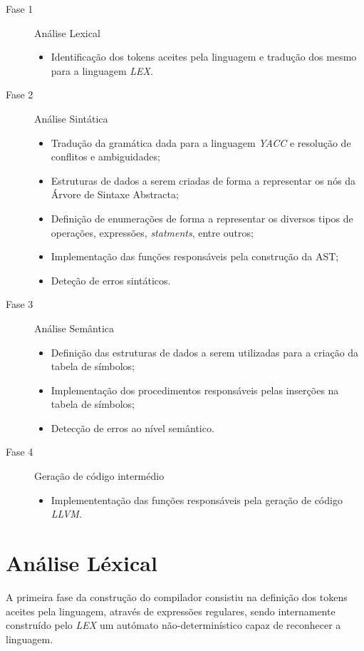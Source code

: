 \documentclass[11pt,a4paper]{article}
\begin{document}
\begin{description}
	\item[Fase 1] Análise Lexical
		\begin{itemize}
			\item Identificação dos tokens aceites pela linguagem e tradução dos mesmo para a linguagem \emph{LEX}. 
		\end{itemize}
	\item[Fase 2] Análise Sintática
		\begin{itemize}
			\item Tradução da gramática dada para a linguagem \emph{YACC} e resolução de conflitos e ambiguidades;
			\item Estruturas de dados a serem criadas de forma a representar os nós da Árvore de Sintaxe Abstracta;
			\item Definição de enumerações de forma a representar os diversos tipos de operações,  expressões, \emph{statments}, entre outros;
			\item Implementação das funções responsáveis pela construção da AST;
			\item Deteção de erros sintáticos.
		\end{itemize}
	\item[Fase 3] Análise Semântica
		\begin{itemize}
			\item Definição das estruturas de dados a serem utilizadas para a criação da tabela de símbolos;
			\item Implementação dos procedimentos responsáveis pelas inserções na tabela de símbolos;
			\item Detecção de erros ao nível semântico. 
		\end{itemize}
	\item[Fase 4] Geração de código intermédio
		\begin{itemize}
			\item Implemententação das funções responsáveis pela geração de código \emph{LLVM}.
		\end{itemize}
\end{description}

\newpage

\section{Análise Léxical}

A primeira fase da construção do compilador consistiu na definição dos tokens aceites pela linguagem, através de expressões regulares, sendo internamente construído pelo \emph{LEX} um autómato não-determinístico capaz de reconhecer a linguagem.
\end{document}
